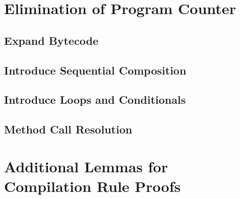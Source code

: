 \section{Elimination of Program Counter}

\subsection{Expand Bytecode}



\pagebreak

\subsection{Introduce Sequential Composition}



\pagebreak

\subsection{Introduce Loops and Conditionals}



\pagebreak

\subsection{Method Call Resolution}



\pagebreak

\section{Additional Lemmas for Compilation Rule Proofs}

